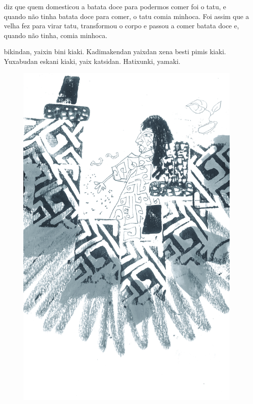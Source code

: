 
 diz que quem
domesticou a batata doce para
podermos comer foi o tatu, e
quando não tinha batata doce
para comer, o tatu comia minhoca.
Foi assim que a velha fez para
virar tatu, transformou o corpo
e passou a comer batata doce e,
quando não tinha, comia minhoca.

\vspace{2em}

 bikindan, yaixin bini kiaki.
Kadimakendan yaixdan
xena besti pimis kiaki.
Yuxabudan eskani kiaki, yaix
katsidan. Hatixunki, yamaki.

\vspace*{\fill}

\pagebreak
\thispagestyle{empty}
\begin{figure}[H]
\vspace*{-2cm}
\hspace*{-2.2cm}\includegraphics[width=138mm]{./imgs/img13.jpg}
\end{figure}

\endgroup



